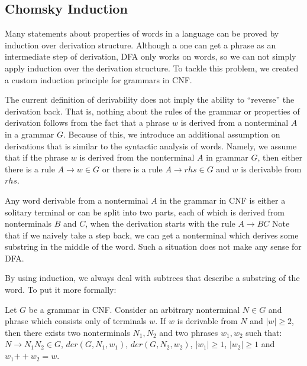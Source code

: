 \subsection{Chomsky Induction}
\label{sec:chomsky-induction}

Many statements about properties of words in a language can be proved by induction over derivation structure.
Although a one can get a phrase as an intermediate step of derivation, DFA only works on words, so we can not simply apply induction over the derivation structure. To tackle this problem, we created a custom induction principle for grammars in CNF.

The current definition of derivability does not imply the ability to ``reverse'' the derivation back. That is, nothing about the rules of the grammar or properties of derivation follows from the fact that a phrase $w$ is derived from a nonterminal $A$ in a grammar $G$. Because of this, we introduce an additional assumption on derivations that is similar to the syntactic analysis of words.
Namely, we assume that if the phrase $w$ is derived from the nonterminal $A$ in grammar $G$, then either there is a rule $A \to w \in G$ or there is a rule $A \to rhs \in G$ and $w$ is derivable from $rhs$.



Any word derivable from a nonterminal $A$ in the grammar in CNF is either a solitary terminal or can be split into two parts, each of which is derived from nonterminals $B$ and $C$, when the derivation starts with the rule $A \to B C$
Note that if we naively take a step back, we can get a nonterminal which derives some substring in the middle of the word.
Such a situation does not make any sense for DFA.

By using induction, we always deal with subtrees that describe a substring of the word.
%
To put it more formally:
\begin{lemma} \label{lemma:chomskyind1}
Let $G$ be a grammar in CNF. Consider an arbitrary nonterminal $N \in G$ and phrase which consists only of terminals $w$.
If $w$ is derivable from $N$ and $|w| \ge 2$, then there exists two nonterminals $N_1, N_2$ and two phrases $w_1, w_2$ such that: $N \to N_1 N_2 \in G$, $der(G, N_1, w_1)$, $der(G, N_2, w_2)$, $|w_1| \ge 1$, $|w_2| \ge 1$ and $w_1 \mathbin{++} w_2 = w$.
\end{lemma}



